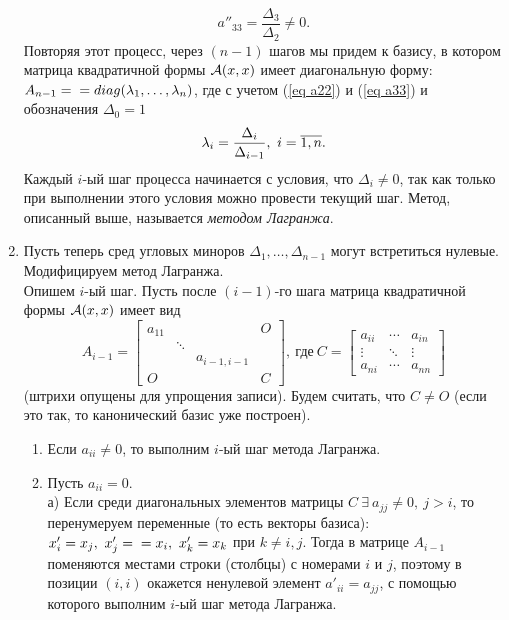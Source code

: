 \begin{proofocre}
\begin{enumerate}
    \begin{equation}
    \label{eq a33}
        a''_{33}=\frac{\Delta_3}{\Delta_2}\neq 0.
    \end{equation}
    Повторяя этот процесс, через $(n-1)$ шагов мы придем к базису, в котором матрица квадратичной формы ${\mathcal{A}}(x,x)$ имеет диагональную форму: $A_{n-1}=\\=diag(\lambda_1,\ldots,\lambda_n)$, где с учетом (\eqref{eq a22}) и (\eqref{eq a33}) и обозначения $\Delta_0=1$
    \begin{equation}
    \label{eq лямбды у квадр.}
        \lambda_i=\frac{\Delta_i}{\Delta_{i-1}},~i=\overline{1,n}.
    \end{equation}
    Каждый $i$-ый шаг процесса начинается с условия, что $\Delta_i\neq 0$, так как только при выполнении этого условия можно провести текущий шаг. Метод, описанный выше, называется \emph{методом Лагранжа}.
    \item Пусть теперь сред угловых миноров $\Delta_1,\ldots,\Delta_{n-1}$ могут встретиться нулевые. Модифицируем метод Лагранжа.\\
    Опишем $i$-ый шаг. Пусть после $(i-1)$-го шага матрица квадратичной формы ${\mathcal{A}}(x,x)$ имеет вид
    $$A_{i-1}=
    \begin{bmatrix}
        a_{11} & & & O\\
        & \ddots & &\\
        & & a_{i-1,i-1} &\\
        O & & & C
    \end{bmatrix},~\text{где}~C=
    \begin{bmatrix}
        a_{ii} & \cdots & a_{in}\\
        \vdots & \ddots & \vdots\\
        a_{ni} & \cdots & a_{nn}
    \end{bmatrix}$$
    (штрихи опущены для упрощения записи). Будем считать, что $C\neq O$ (если это так, то канонический базис уже построен).
    \begin{enumerate}
        \item Если $a_{ii}\neq 0$, то выполним $i$-ый шаг метода Лагранжа.
        \item Пусть $a_{ii}=0$.\\
        а) Если среди диагональных элементов матрицы $C~\exists~a_{jj}\neq 0,~j>i$, то перенумеруем переменные (то есть векторы базиса): $x'_i=x_j,~x'_j=\\=x_i,~x'_k=x_k$ при $k\neq i,j$. Тогда в матрице $A_{i-1}$ поменяются местами строки (столбцы) с номерами $i$ и $j$, поэтому в позиции $(i,i)$ окажется ненулевой элемент $a'_{ii}=a_{jj}$, с помощью которого выполним $i$-ый шаг метода Лагранжа.\\

\end{enumerate}
\end{enumerate}
\end{proofocre}
